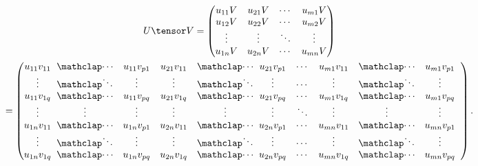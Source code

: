 \begin{definition}
  \begin{gather*}
    U \tensor V =
    \begin{pmatrix}
      u_{11}V & u_{21}V & \cdots & u_{m1}V \\
      u_{12}V & u_{22}V & \cdots & u_{m2}V \\
      \vdots & \vdots & \ddots & \vdots \\
      u_{1n}V & u_{2n}V & \cdots & u_{mn}V
    \end{pmatrix} \\ =
    \left(\begin{array}{@{}*{2}{c@{\;\;}ccc}cc@{\;\;}ccc@{}}
      u_{11}v_{11} & \icdots & u_{11}v_{p1} &
      u_{21}v_{11} & \icdots & u_{21}v_{p1} &
      \cdots &
      u_{m1}v_{11} & \icdots & u_{m1}v_{p1}
      \\
      \vdots & \iddots & \vdots &
      \vdots & \iddots & \vdots &
      \cdots &
      \vdots & \iddots & \vdots
      \\
      u_{11}v_{1q} & \icdots & u_{11}v_{pq} &
      u_{21}v_{1q} & \icdots & u_{21}v_{pq} &
      \cdots &
      u_{m1}v_{1q} & \icdots & u_{m1}v_{pq}
      \\
      \vdots & \vdots & \vdots &
      \vdots & \vdots & \vdots &
      \ddots &
      \vdots & \vdots & \vdots
      \\
      u_{1n}v_{11} & \icdots & u_{1n}v_{p1} &
      u_{2n}v_{11} & \icdots & u_{2n}v_{p1} &
      \cdots &
      u_{mn}v_{11} & \icdots & u_{mn}v_{p1}
      \\
      \vdots & \iddots & \vdots &
      \vdots & \iddots & \vdots &
      \cdots &
      \vdots & \iddots & \vdots
      \\
      u_{1n}v_{1q} & \icdots & u_{1n}v_{pq} &
      u_{2n}v_{1q} & \icdots & u_{2n}v_{pq} &
      \cdots &
      u_{mn}v_{1q} & \icdots & u_{mn}v_{pq}
    \end{array}\right).%
  \end{gather*}

\end{definition}

